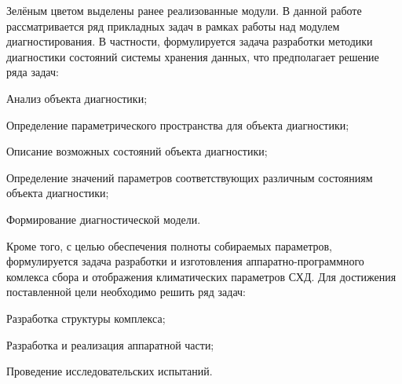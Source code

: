 Зелёным цветом выделены ранее реализованные модули.
В данной работе рассматривается ряд прикладных задач в рамках работы над модулем диагностирования. В частности, формулируется задача разработки методики диагностики состояний системы хранения данных, что предполагает решение ряда задач:
\begin{itemize*}
	\item{Анализ объекта диагностики;}
	\item{Определение параметрического пространства для объекта диагностики;}
	\item{Описание возможных состояний объекта диагностики;}
	\item{Определение значений параметров соответствующих различным состояниям объекта диагностики;}
	\item{Формирование диагностической модели.}
\end{itemize*}
Кроме того, с целью обеспечения полноты собираемых параметров, формулируется задача разработки и изготовления аппаратно-программного комлекса сбора и отображения климатических параметров СХД. Для достижения поставленной цели необходимо решить ряд задач: 
\begin{itemize*}
	\item{Разработка структуры комплекса;}
	\item{Разработка и реализация аппаратной части;}
	\item{Проведение исследовательских испытаний.}
\end{itemize*}	 

 

